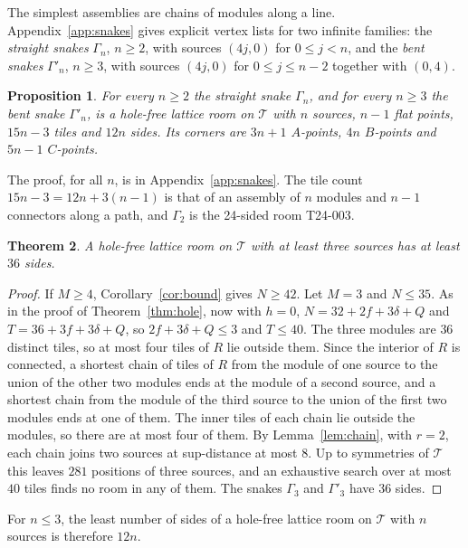 \documentclass[11pt,a4paper]{article}
\theoremstyle{plain}
\newtheorem{theorem}{Theorem}[section]
\newtheorem{proposition}[theorem]{Proposition}
\theoremstyle{definition}
\theoremstyle{remark}
\newcommand{\T}{\mathcal{T}}
\numberwithin{equation}{section}
\begin{document}
The simplest assemblies are chains of modules along a line. Appendix~\ref{app:snakes} gives explicit vertex lists for two infinite families: the \emph{straight snakes} $\Gamma_n$, $n\ge2$, with sources $(4j,0)$ for $0\le j<n$, and the \emph{bent snakes} $\Gamma'_n$, $n\ge3$, with sources $(4j,0)$ for $0\le j\le n-2$ together with $(0,4)$.

\begin{proposition}\label{prop:snakes}
For every $n\ge2$ the straight snake $\Gamma_n$, and for every $n\ge3$ the bent snake $\Gamma'_n$, is a hole-free lattice room on $\T$ with $n$ sources, $n-1$ flat points, $15n-3$ tiles and $12n$ sides. Its corners are $3n+1$ $A$-points, $4n$ $B$-points and $5n-1$ $C$-points.
\end{proposition}

The proof, for all $n$, is in Appendix~\ref{app:snakes}. The tile count $15n-3=12n+3(n-1)$ is that of an assembly of $n$ modules and $n-1$ connectors along a path, and $\Gamma_2$ is the 24-sided room T24-003.

\begin{theorem}\label{thm:three}
A hole-free lattice room on $\T$ with at least three sources has at least $36$ sides.
\end{theorem}

\begin{proof}
If $M\ge4$, Corollary~\ref{cor:bound} gives $N\ge42$. Let $M=3$ and $N\le35$. As in the proof of Theorem~\ref{thm:hole}, now with $h=0$, $N=32+2f+3\delta+Q$ and $T=36+3f+3\delta+Q$, so $2f+3\delta+Q\le3$ and $T\le40$. The three modules are $36$ distinct tiles, so at most four tiles of $R$ lie outside them. Since the interior of $R$ is connected, a shortest chain of tiles of $R$ from the module of one source to the union of the other two modules ends at the module of a second source, and a shortest chain from the module of the third source to the union of the first two modules ends at one of them. The inner tiles of each chain lie outside the modules, so there are at most four of them. By Lemma~\ref{lem:chain}, with $r=2$, each chain joins two sources at sup-distance at most $8$. Up to symmetries of $\T$ this leaves $281$ positions of three sources, and an exhaustive search over at most $40$ tiles finds no room in any of them. The snakes $\Gamma_3$ and $\Gamma'_3$ have $36$ sides.
\end{proof}

For $n\le3$, the least number of sides of a hole-free lattice room on $\T$ with $n$ sources is therefore $12n$.
\end{document}
